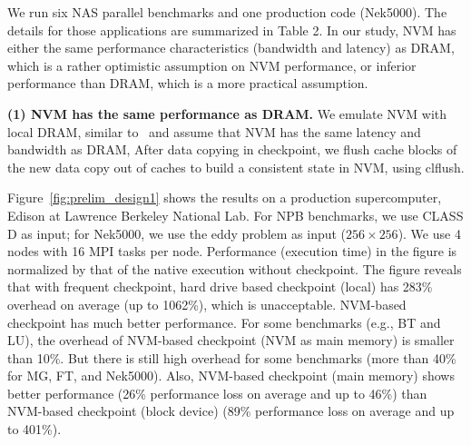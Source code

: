 We run six NAS parallel benchmarks and one production code (Nek5000). The details for those applications are summarized in Table 2. 
In our study, NVM has either the same performance characteristics (bandwidth and latency) as DRAM, which is a rather optimistic assumption on NVM performance, or inferior performance than DRAM, which is a more practical assumption. 

\textbf{(1) NVM has the same performance as DRAM.} 
We emulate NVM with local DRAM, similar to~\cite{asplos15:zhang} and assume that NVM has the same latency and bandwidth as DRAM, 
After data copying in checkpoint, we flush cache blocks of the new data copy out of caches to build a consistent state in NVM, using {\selectfont clflush}.

Figure~\ref{fig:prelim_design1} shows the results on a production supercomputer, Edison at Lawrence Berkeley National Lab. 
For NPB benchmarks, we use CLASS D as input; for Nek5000, we use the eddy problem as input ($256 \times 256$). %
We use 4 nodes with 16 MPI tasks per node.
Performance (execution time) in the figure is normalized by that of the native execution without checkpoint. 
The figure reveals that with frequent checkpoint, hard drive based checkpoint (local) has 283\% overhead on average (up to 1062\%), which is unacceptable.
NVM-based checkpoint has much better performance.
For some benchmarks (e.g., BT and LU), the overhead of NVM-based checkpoint (NVM as main memory) is smaller than 10\%.
But there is still high overhead for some benchmarks (more than 40\% for MG, FT, and Nek5000).
Also, NVM-based checkpoint (main memory) shows better performance (26\% performance loss on average and up to 46\%) than NVM-based checkpoint (block device) (89\% performance loss on average and up to 401\%).

